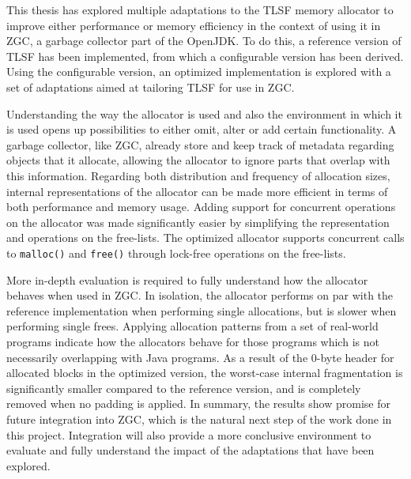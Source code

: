 
This thesis has explored multiple adaptations to the TLSF memory allocator to improve either performance or memory efficiency in the context of using it in ZGC, a garbage collector part of the OpenJDK. To do this, a reference version of TLSF has been implemented, from which a configurable version has been derived. Using the configurable version, an optimized implementation is explored with a set of adaptations aimed at tailoring TLSF for use in ZGC.

Understanding the way the allocator is used and also the environment in which it is used opens up possibilities to either omit, alter or add certain functionality. A garbage collector, like ZGC, already store and keep track of metadata regarding objects that it allocate, allowing the allocator to ignore parts that overlap with this information. Regarding both distribution and frequency of allocation sizes, internal representations of the allocator can be made more efficient in terms of both performance and memory usage. Adding support for concurrent operations on the allocator was made significantly easier by simplifying the representation and operations on the free-lists. The optimized allocator supports concurrent calls to \texttt{malloc()} and \texttt{free()} through lock-free operations on the free-lists.

More in-depth evaluation is required to fully understand how the allocator behaves when used in ZGC. In isolation, the allocator performs on par with the reference implementation when performing single allocations, but is slower when performing single frees. Applying allocation patterns from a set of real-world programs indicate how the allocators behave for those programs which is not necessarily overlapping with Java programs. As a result of the 0-byte header for allocated blocks in the optimized version, the worst-case internal fragmentation is significantly smaller compared to the reference version, and is completely removed when no padding is applied. In summary, the results show promise for future integration into ZGC, which is the natural next step of the work done in this project. Integration will also provide a more conclusive environment to evaluate and fully understand the impact of the adaptations that have been explored.

